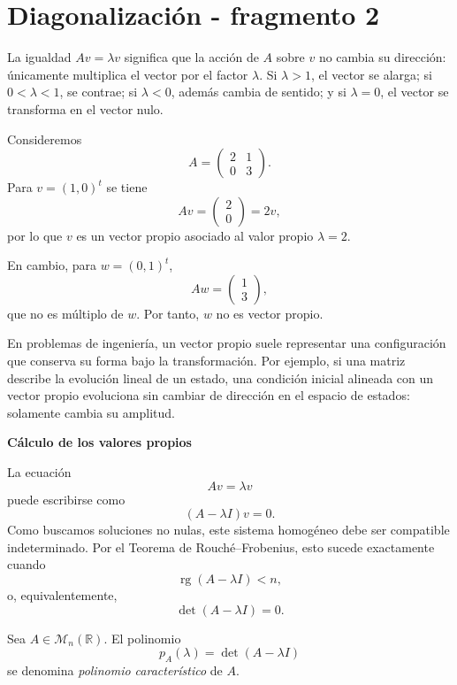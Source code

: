 \section{Diagonalización - fragmento 2}
La igualdad $Av=\lambda v$ significa que la acción de $A$ sobre $v$ no cambia su dirección: únicamente multiplica el vector por el factor $\lambda$. Si $\lambda>1$, el vector se alarga; si $0<\lambda<1$, se contrae; si $\lambda<0$, además cambia de sentido; y si $\lambda=0$, el vector se transforma en el vector nulo.

\begin{example}
Consideremos
\[
A=\begin{pmatrix}
2&1\\
0&3
\end{pmatrix}.
\]
Para $v=(1,0)^t$ se tiene
\[
Av=\begin{pmatrix}2\\0\end{pmatrix}=2v,
\]
por lo que $v$ es un vector propio asociado al valor propio $\lambda=2$.

En cambio, para $w=(0,1)^t$,
\[
Aw=\begin{pmatrix}1\\3\end{pmatrix},
\]
que no es múltiplo de $w$. Por tanto, $w$ no es vector propio.
\end{example}

En problemas de ingeniería, un vector propio suele representar una configuración que conserva su forma bajo la transformación. Por ejemplo, si una matriz describe la evolución lineal de un estado, una condición inicial alineada con un vector propio evoluciona sin cambiar de dirección en el espacio de estados: solamente cambia su amplitud.

\textbf{Cálculo de los valores propios}

La ecuación
\[
Av=\lambda v
\]
puede escribirse como
\[
(A-\lambda I)v=0.
\]
Como buscamos soluciones no nulas, este sistema homogéneo debe ser compatible indeterminado. Por el Teorema de Rouché--Frobenius, esto sucede exactamente cuando
\[
\operatorname{rg}(A-\lambda I)<n,
\]
o, equivalentemente,
\[
\det(A-\lambda I)=0.
\]

\begin{definition}
Sea $A\in\mathcal M_n(\mathbb{R})$. El polinomio
\[
p_A(\lambda)=\det(A-\lambda I)
\]
se denomina \emph{polinomio característico} de $A$.
\end{definition}

